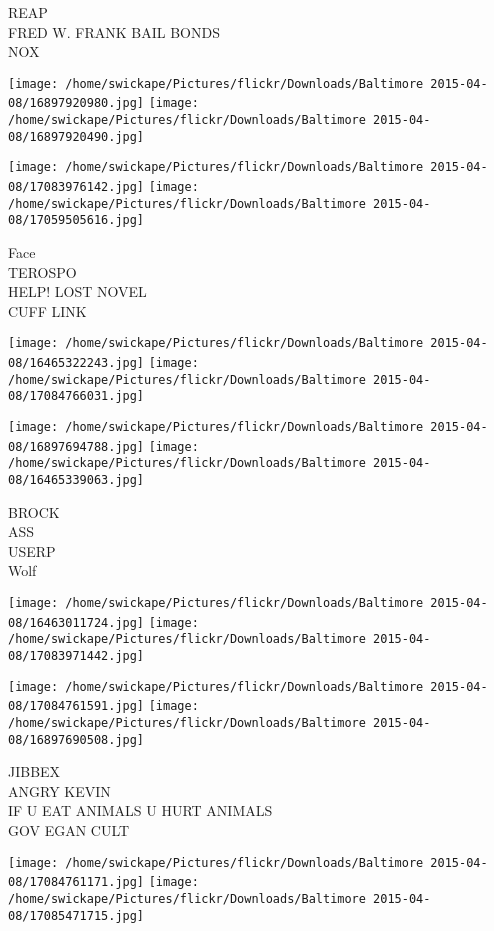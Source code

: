 \documentclass[10pt,letterpaper]{article}
\begin{document}
REAP\\
FRED W. FRANK BAIL BONDS\\
NOX
\pagebreak

\texttt{[image: /home/swickape/Pictures/flickr/Downloads/Baltimore 2015-04-08/16897920980.jpg]}
\texttt{[image: /home/swickape/Pictures/flickr/Downloads/Baltimore 2015-04-08/16897920490.jpg]}

\texttt{[image: /home/swickape/Pictures/flickr/Downloads/Baltimore 2015-04-08/17083976142.jpg]}
\texttt{[image: /home/swickape/Pictures/flickr/Downloads/Baltimore 2015-04-08/17059505616.jpg]}

Face\\
TEROSPO\\
HELP!  LOST NOVEL\\
CUFF LINK
\pagebreak

\texttt{[image: /home/swickape/Pictures/flickr/Downloads/Baltimore 2015-04-08/16465322243.jpg]}
\texttt{[image: /home/swickape/Pictures/flickr/Downloads/Baltimore 2015-04-08/17084766031.jpg]}

\texttt{[image: /home/swickape/Pictures/flickr/Downloads/Baltimore 2015-04-08/16897694788.jpg]}
\texttt{[image: /home/swickape/Pictures/flickr/Downloads/Baltimore 2015-04-08/16465339063.jpg]}

BROCK\\
ASS\\
USERP\\
Wolf
\pagebreak

\texttt{[image: /home/swickape/Pictures/flickr/Downloads/Baltimore 2015-04-08/16463011724.jpg]}
\texttt{[image: /home/swickape/Pictures/flickr/Downloads/Baltimore 2015-04-08/17083971442.jpg]}

\texttt{[image: /home/swickape/Pictures/flickr/Downloads/Baltimore 2015-04-08/17084761591.jpg]}
\texttt{[image: /home/swickape/Pictures/flickr/Downloads/Baltimore 2015-04-08/16897690508.jpg]}

JIBBEX\\
ANGRY KEVIN\\
IF U EAT ANIMALS U HURT ANIMALS\\
GOV EGAN CULT
\pagebreak

\texttt{[image: /home/swickape/Pictures/flickr/Downloads/Baltimore 2015-04-08/17084761171.jpg]}
\texttt{[image: /home/swickape/Pictures/flickr/Downloads/Baltimore 2015-04-08/17085471715.jpg]}
\end{document}
